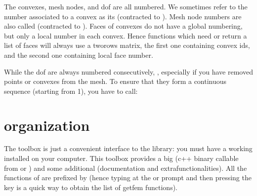 \documentclass[a4paper,11pt,english]{sphinxmanual}
\begin{document}
\sphinxAtStartPar
The convexes, mesh nodes, and dof are all numbered. We sometimes refer to the
number associated to a convex as its  (contracted to
). Mesh node numbers are also called  (contracted
to ). Faces of convexes do not have a global numbering, but only a
local number in each convex. Hence functions which need or return a list of faces
will always use a two\sphinxhyphen{}rows matrix, the first one containing convex ids, and the
second one containing local face number.

\sphinxAtStartPar
While the dof are always numbered consecutively, , especially if you have removed points or convexes from
the mesh. To ensure that they form a continuous sequence (starting from 1), you
have to call:

\begin{sphinxVerbatim}[commandchars=\\\{\}]
\end{sphinxVerbatim}


\chapter{ organization}
\label{\detokenize{matlab_octave/mlabgf:gfm-organization}}\label{\detokenize{matlab_octave/mlabgf:mlab-mlabgf}}\label{\detokenize{matlab_octave/mlabgf::doc}}
\sphinxAtStartPar
The  toolbox is just a convenient interface to the  library: you must
have a working  installed on your computer. This toolbox provides a big
 (c++ binary callable from  or ) and some additional
 (documentation and extra\sphinxhyphen{}functionalities). All the functions of 
are prefixed by  (hence typing  at the  or  prompt and then
pressing the  key is a quick way to obtain the list of getfem
functions).
\end{document}
